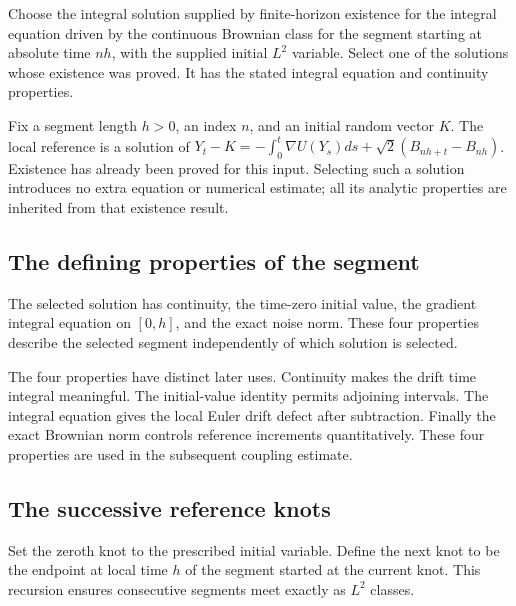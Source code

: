 \documentclass[11pt,a4paper]{report}
\begin{document}
Choose the integral solution supplied by finite-horizon existence for the integral equation driven by the continuous Brownian class for the segment starting at absolute time \(nh\), with the supplied initial \(L^2\) variable. Select one of the solutions whose existence was proved. It has the stated integral equation and continuity properties.



Fix a segment length \(h>0\), an index \(n\), and an initial random vector \(K\). The local reference is a solution of \(Y_t-K=-\int_0^t\nabla U(Y_s)ds+\sqrt2(B_{nh+t}-B_{nh})\). Existence has already been proved for this input. Selecting such a solution introduces no extra equation or numerical estimate; all its analytic properties are inherited from that existence result.

\subsection{\texorpdfstring{The defining properties of the segment}{The defining properties of the segment}}
\label{report-step-UnadjustedLangevin-BrownianReference-lean-2}


The selected solution has continuity, the time-zero initial value, the gradient integral equation on \([0,h]\), and the exact noise norm. These four properties describe the selected segment independently of which solution is selected.



The four properties have distinct later uses. Continuity makes the drift time integral meaningful. The initial-value identity permits adjoining intervals. The integral equation gives the local Euler drift defect after subtraction. Finally the exact Brownian norm controls reference increments quantitatively. These four properties are used in the subsequent coupling estimate.

\subsection{\texorpdfstring{The successive reference knots}{The successive reference knots}}
\label{report-step-UnadjustedLangevin-BrownianReference-lean-3}


Set the zeroth knot to the prescribed initial variable. Define the next knot to be the endpoint at local time \(h\) of the segment started at the current knot. This recursion ensures consecutive segments meet exactly as \(L^2\) classes.
\end{document}
